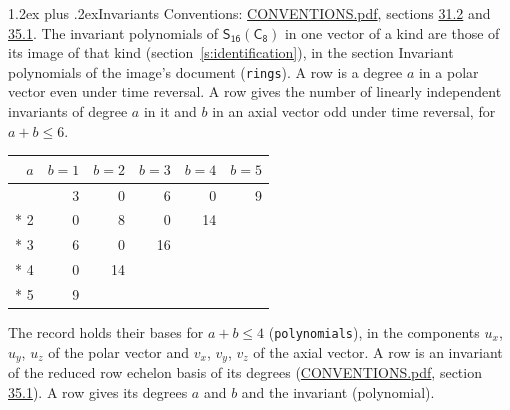 \documentclass[10pt,a4paper]{article}
\makeatletter
\renewcommand\section{\@startsection{section}{1}{\z@}{-3ex plus -1ex minus -.2ex}%
  {1.2ex plus .2ex}{\normalfont\large\sffamily\bfseries\color{parttitle}}}
\numberwithin{equation}{section}
\newcommand{\grp}[1]{\mathsf{#1}}
\makeatother
\begin{document}
\section{Invariants}\label{s:invariants}
Conventions: \href{../../CONVENTIONS.pdf}{CONVENTIONS.pdf}, sections \href{../../CONVENTIONS.pdf\#conv.31.2}{31.2} and \href{../../CONVENTIONS.pdf\#conv.35.1}{35.1}.
The invariant polynomials of $\grp{S_{16}}(\grp{C_{8}})$ in one vector of a kind are those of its image of that kind (section~\ref{s:identification}), in the section Invariant polynomials of the image's document (\texttt{rings}).
\leavevmode\label{n:index.degree.polar}\label{n:index.degree.axial}A row is a degree $a$ in a polar vector even under time reversal. A row gives the number of linearly independent invariants of degree $a$ in it and $b$ in an axial vector odd under time reversal, for $a + b \le 6$.
{\small\begin{longtable}{@{}rrrrrr@{}}\toprule
$a$ & $b = 1$ & $b = 2$ & $b = 3$ & $b = 4$ & $b = 5$\\\midrule\endhead
\bottomrule\endfoot\endlastfoot
1 & 3 & 0 & 6 & 0 & 9\\*
2 & 0 & 8 & 0 & 14 & \\*
3 & 6 & 0 & 16 &  & \\*
4 & 0 & 14 &  &  & \\*
5 & 9 &  &  &  & \\
\bottomrule\end{longtable}}
\leavevmode\label{n:local.component.polar}\label{n:local.component.axial}The record holds their bases for $a + b \le 4$ (\texttt{polynomials}), in the components $u_{x}$, $u_{y}$, $u_{z}$ of the polar vector and $v_{x}$, $v_{y}$, $v_{z}$ of the axial vector. \label{n:head.polynomial}A row is an invariant of the reduced row echelon basis of its degrees (\href{../../CONVENTIONS.pdf}{CONVENTIONS.pdf}, section \href{../../CONVENTIONS.pdf\#conv.35.1}{35.1}). A row gives its degrees $a$ and $b$ and the invariant (polynomial).
\end{document}
